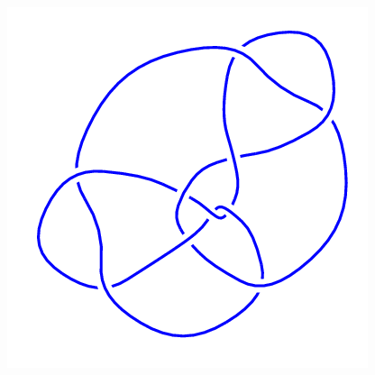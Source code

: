 \begin{figure}[H]
\begin{minipage}[b]{.18\linewidth}
    \end{minipage}
    \begin{minipage}[b]{.18\linewidth}
        \centering
        \includegraphics[width=\linewidth]{../data/10_96.png}
    \end{minipage}
\end{figure}
